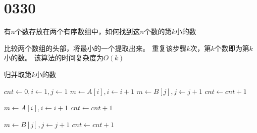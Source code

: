 \section{0330}\label{sec:0330}
\begin{questions}

    \question 有$n$个数存放在两个有序数组中，如何找到这$n$个数的第$k$小的数

    \begin{solution}
        比较两个数组的头部，将最小的一个提取出来。
        重复该步骤$k$次，第$k$个数即为第$k$小的数。
        该算法的时间复杂度为$O(k)$

        \begin{algorithm}[H]
            \caption{归并取第$k$小的数}\label{0330:MeargeSmallestK}
            \begin{algorithmic}[1]
                 
                \State $cnt \gets 0, i \gets 1, j \gets 1$
                \State $m \gets A[i], i \gets i + 1$
                \Else
                \State $m \gets B[j], j \gets j + 1$
                \EndIf
                \State $cnt \gets cnt + 1$
                \EndWhile

                \State $m \gets A[i], i \gets i + 1$
                \State $cnt \gets cnt + 1$
                \EndWhile

                \State $m \gets B[j], j \gets j + 1$
                \State $cnt \gets cnt + 1$
                \EndWhile
            \end{algorithmic}
        \end{algorithm}
    \end{solution}


\end{questions}
